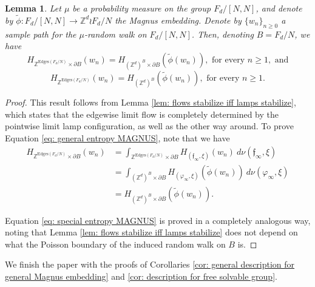 \documentclass[reqno,oneside,11pt]{amsart}
\newcommand{\Z}{\mathbb{Z}}
\theoremstyle{plain}
\newtheorem{lem}[thm]{Lemma}
\theoremstyle{definition}
\begin{document}
\begin{lem}\label{lem: via MAGNUS equal entropies}
	Let $\mu$ be a probability measure on the group $F_d/[N,N]$, and denote by $\widetilde{\phi}:F_d/[N,N]\to \Z^d\wr F_d/N$ the Magnus embedding. Denote by $\{w_n\}_{n\ge 0}$ a sample path for the $\mu$-random walk on $F_d/[N,N]$. Then, denoting $B=F_d/N$, we have
	\begin{equation}\label{eq: general entropy MAGNUS}
			H_{\Z^{\mathrm{Edges}(F_d/N)}\times \partial B}(w_n)=H_{(\Z^d)^B\times \partial B}\left(\widetilde{\phi}(w_n)\right), \text{ for every }n\ge 1, \text{ and}
\end{equation}
	\begin{equation}\label{eq: special entropy MAGNUS}
	H_{\Z^{\mathrm{Edges}(F_d/N)}}(w_n)=H_{(\Z^d)^B }\left(\widetilde{\phi}(w_n)\right), \text{ for every }n\ge 1.
\end{equation}

\end{lem}
\begin{proof}
	This result follows from  Lemma \ref{lem: flows stabilize iff lamps stabilize}, which states that the edgewise limit flow is completely determined by the pointwise limit lamp configuration, as well as the other way around. To prove Equation \eqref{eq: general entropy MAGNUS}, note that we have
	\begin{align*}
			H_{\Z^{\mathrm{Edges}(F_d/N)}\times \partial B}(w_n)&=\int_{\Z^{\mathrm{Edges}(F_d/N)}\times \partial B}H_{(\mathfrak{f}_{\infty},\xi)}(w_n)\ d\nu(\mathfrak{f}_{\infty},\xi)\\
			&=\int_{(\Z^d)^B\times \partial B}H_{(\varphi_{\infty},\xi)}(\widetilde{\phi}(w_n))\ d\nu(\varphi_{\infty},\xi)\\
			&=H_{(\Z^d)^B\times \partial B}\left(\widetilde{\phi}(w_n)\right).
	\end{align*}

Equation \eqref{eq: special entropy MAGNUS} is proved in a completely analogous way, noting that Lemma \ref{lem: flows stabilize iff lamps stabilize} does not depend on what the Poisson boundary of the induced random walk on $B$ is.
\end{proof}
We finish the paper with the proofs of Corollaries \ref{cor: general description for general Magnus embedding} and \ref{cor: description for free solvable group}.	
\end{document}
